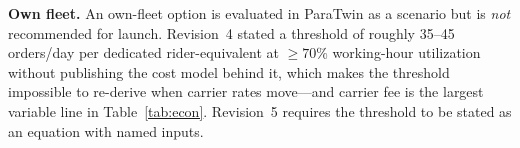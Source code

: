 \textbf{Own fleet.} An own-fleet option is evaluated in ParaTwin as a scenario but is \emph{not} recommended for launch. Revision~4 stated a threshold of roughly 35--45 orders/day per dedicated rider-equivalent at $\ge70\%$ working-hour utilization without publishing the cost model behind it, which makes the threshold impossible to re-derive when carrier rates move---and carrier fee is the largest variable line in Table~\ref{tab:econ}. Revision~5 requires the threshold to be stated as an equation with named inputs. 
